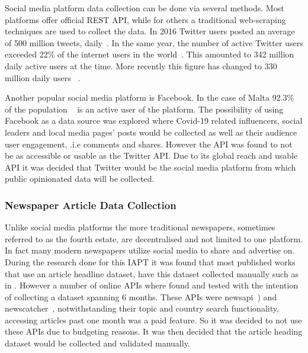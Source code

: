 Social media platform data collection can be done via several methods.
Most platforms offer official \ac{REST} \ac{API}, while for others a traditional web-scraping techniques are used to collect the data.
In 2016 Twitter users posted an average of 500 million tweets, daily~\citep{Crannell2016}.
In the same year, the number of active Twitter users exceeded 22\% of the internet users in the world~\citep{Kayser2016}.
This amounted to 342 million daily active users at the time.
More recently this figure has changed to 330 million daily users ~\citep{tankovska_2021}.

Another popular social media platform is Facebook.
In the case of Malta 92.3\% of the population ~\citep{napoleoncat} is an active user of the platform.
The possibility of using Facebook as a data source was explored where Covid-19 related influencers, social leaders and local media pages' posts would be collected as well as their audience user engagement, .i.e comments and shares.
However the \ac{API} was found to not be as accessible or usable as the Twitter \ac{API}.
Due to its global reach and usable \ac{API} it was decided that Twitter would be the social media platform from which public opinionated data will be collected.

\subsubsection{Newspaper Article Data Collection}

Unlike social media platforms the more traditional newspapers, sometimes referred to as the fourth estate, are decentralised and not limited to one platform.
In fact many modern newspapers utilize social media to share and advertise on.
During the research done for this \ac{IAPT} it was found that most published works that use an article headline dataset, have this dataset collected manually such as in \citet{newspaper_headlines}.
However a number of online \ac{API}s where found and tested with the intention of collecting a dataset spanning 6 months.
These \ac{API}s were newsapi~\citep{newsapi}) and newscatcher~\citep{newscatcher}, notwithstanding their topic and country search functionality, accessing articles past one month was a paid feature.
So it was decided to not use these \ac{API}s due to budgeting reasons.
It was then decided that the article heading dataset would be collected and validated manually.


